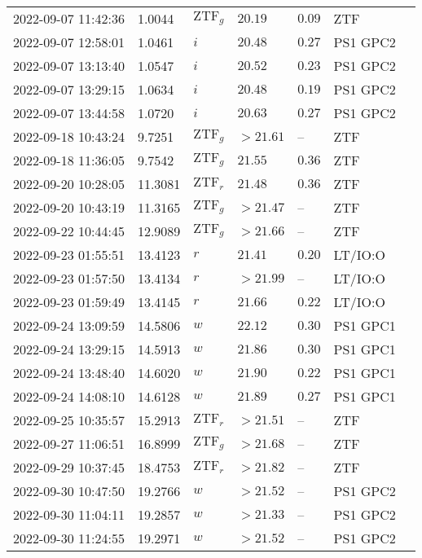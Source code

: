\documentclass{nature_plusfigure}
\begin{document}
\begin{supplement}
\begin{center}
\begin{longtable}{lllllll}
2022-09-07 11:42:36 & 1.0044 & $\mathrm{ZTF}_{g}$ & $20.19$ & $0.09$ & ZTF &  \\ 
2022-09-07 12:58:01 & 1.0461 & $i$ & $20.48$ & $0.27$ & PS1 GPC2 &  \\ 
2022-09-07 13:13:40 & 1.0547 & $i$ & $20.52$ & $0.23$ & PS1 GPC2 &  \\ 
2022-09-07 13:29:15 & 1.0634 & $i$ & $20.48$ & $0.19$ & PS1 GPC2 &  \\ 
2022-09-07 13:44:58 & 1.0720 & $i$ & $20.63$ & $0.27$ & PS1 GPC2 &  \\ 
2022-09-18 10:43:24 & 9.7251 & $\mathrm{ZTF}_{g}$ & $>21.61$ & -- & ZTF &  \\ 
2022-09-18 11:36:05 & 9.7542 & $\mathrm{ZTF}_{g}$ & $21.55$ & $0.36$ & ZTF &  \\ 
2022-09-20 10:28:05 & 11.3081 & $\mathrm{ZTF}_{r}$ & $21.48$ & $0.36$ & ZTF &  \\ 
2022-09-20 10:43:19 & 11.3165 & $\mathrm{ZTF}_{g}$ & $>21.47$ & -- & ZTF &  \\ 
2022-09-22 10:44:45 & 12.9089 & $\mathrm{ZTF}_{g}$ & $>21.66$ & -- & ZTF &  \\ 
2022-09-23 01:55:51 & 13.4123 & $r$ & $21.41$ & $0.20$ & LT/IO:O &  \\ 
2022-09-23 01:57:50 & 13.4134 & $r$ & $>21.99$ & -- & LT/IO:O &  \\ 
2022-09-23 01:59:49 & 13.4145 & $r$ & $21.66$ & $0.22$ & LT/IO:O &  \\ 
2022-09-24 13:09:59 & 14.5806 & $w$ & $22.12$ & $0.30$ & PS1 GPC1 &  \\ 
2022-09-24 13:29:15 & 14.5913 & $w$ & $21.86$ & $0.30$ & PS1 GPC1 &  \\ 
2022-09-24 13:48:40 & 14.6020 & $w$ & $21.90$ & $0.22$ & PS1 GPC1 &  \\ 
2022-09-24 14:08:10 & 14.6128 & $w$ & $21.89$ & $0.27$ & PS1 GPC1 &  \\ 
2022-09-25 10:35:57 & 15.2913 & $\mathrm{ZTF}_{r}$ & $>21.51$ & -- & ZTF &  \\ 
2022-09-27 11:06:51 & 16.8999 & $\mathrm{ZTF}_{g}$ & $>21.68$ & -- & ZTF &  \\ 
2022-09-29 10:37:45 & 18.4753 & $\mathrm{ZTF}_{r}$ & $>21.82$ & -- & ZTF &  \\ 
2022-09-30 10:47:50 & 19.2766 & $w$ & $>21.52$ & -- & PS1 GPC2 &  \\ 
2022-09-30 11:04:11 & 19.2857 & $w$ & $>21.33$ & -- & PS1 GPC2 &  \\ 
2022-09-30 11:24:55 & 19.2971 & $w$ & $>21.52$ & -- & PS1 GPC2 &  \\ 

\end{longtable}
\end{center}
\end{supplement}
\end{document}
